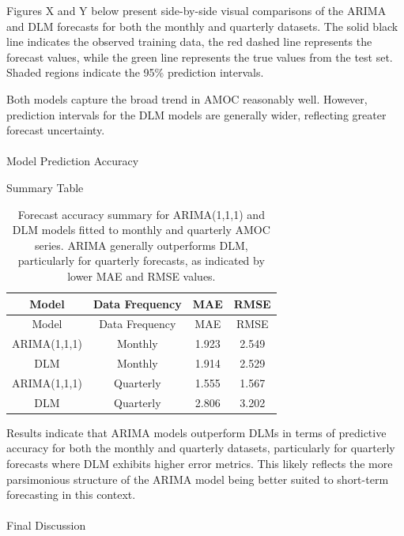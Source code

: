 \documentclass[
  11pt,
]{article}
\makeatletter
\let\oldparagraph\paragraph
\renewcommand{\paragraph}{
    \@ifstar
      \xxxParagraphStar
      \xxxParagraphNoStar
  }
\newcommand{\xxxParagraphStar}[1]{\oldparagraph*{#1}\mbox{}}
\newcommand{\xxxParagraphNoStar}[1]{\oldparagraph{#1}\mbox{}}
\makeatother
\begin{document}
Figures X and Y below present side-by-side visual comparisons of the
ARIMA and DLM forecasts for both the monthly and quarterly datasets. The
solid black line indicates the observed training data, the red dashed
line represents the forecast values, while the green line represents the
true values from the test set. Shaded regions indicate the 95\%
prediction intervals.

Both models capture the broad trend in AMOC reasonably well. However,
prediction intervals for the DLM models are generally wider, reflecting
greater forecast uncertainty.

\paragraph{Model Prediction Accuracy}\label{model-prediction-accuracy}

Summary Table

\begin{longtable}[]{@{}cccc@{}}
\caption{Forecast accuracy summary for ARIMA(1,1,1) and DLM models
fitted to monthly and quarterly AMOC series. ARIMA generally outperforms
DLM, particularly for quarterly forecasts, as indicated by lower MAE and
RMSE values.}\tabularnewline
\toprule\noalign{}
Model & Data Frequency & MAE & RMSE \\
\midrule\noalign{}
\endfirsthead
\toprule\noalign{}
Model & Data Frequency & MAE & RMSE \\
\midrule\noalign{}
\endhead
\bottomrule\noalign{}
\endlastfoot
ARIMA(1,1,1) & Monthly & 1.923 & 2.549 \\
DLM & Monthly & 1.914 & 2.529 \\
ARIMA(1,1,1) & Quarterly & 1.555 & 1.567 \\
DLM & Quarterly & 2.806 & 3.202 \\
\end{longtable}

Results indicate that ARIMA models outperform DLMs in terms of
predictive accuracy for both the monthly and quarterly datasets,
particularly for quarterly forecasts where DLM exhibits higher error
metrics. This likely reflects the more parsimonious structure of the
ARIMA model being better suited to short-term forecasting in this
context.

\paragraph{Final Discussion}\label{final-discussion}
\end{document}
